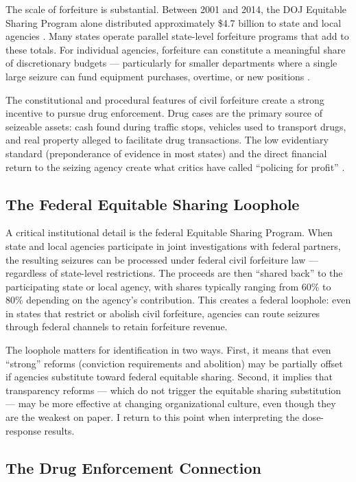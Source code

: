 \documentclass[12pt]{article}
\begin{document}
The scale of forfeiture is substantial. Between 2001 and 2014, the DOJ Equitable Sharing Program alone distributed approximately \$4.7 billion to state and local agencies \citep{carpenter2020policing}. Many states operate parallel state-level forfeiture programs that add to these totals. For individual agencies, forfeiture can constitute a meaningful share of discretionary budgets --- particularly for smaller departments where a single large seizure can fund equipment purchases, overtime, or new positions \citep{holcomb2018civil}.

The constitutional and procedural features of civil forfeiture create a strong incentive to pursue drug enforcement. Drug cases are the primary source of seizeable assets: cash found during traffic stops, vehicles used to transport drugs, and real property alleged to facilitate drug transactions. The low evidentiary standard (preponderance of evidence in most states) and the direct financial return to the seizing agency create what critics have called ``policing for profit'' \citep{carpenter2020policing}.

\subsection{The Federal Equitable Sharing Loophole}

A critical institutional detail is the federal Equitable Sharing Program. When state and local agencies participate in joint investigations with federal partners, the resulting seizures can be processed under federal civil forfeiture law --- regardless of state-level restrictions. The proceeds are then ``shared back'' to the participating state or local agency, with shares typically ranging from 60\% to 80\% depending on the agency's contribution. This creates a federal loophole: even in states that restrict or abolish civil forfeiture, agencies can route seizures through federal channels to retain forfeiture revenue.

The loophole matters for identification in two ways. First, it means that even ``strong'' reforms (conviction requirements and abolition) may be partially offset if agencies substitute toward federal equitable sharing. Second, it implies that transparency reforms --- which do not trigger the equitable sharing substitution --- may be more effective at changing organizational culture, even though they are the weakest on paper. I return to this point when interpreting the dose-response results.

\subsection{The Drug Enforcement Connection}
\end{document}
